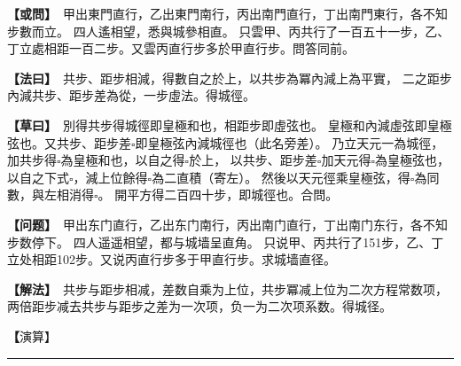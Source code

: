 \documentclass[11pt,a4paper]{article}
\let\origsquare\square
\renewcommand{\square}{\ensuremath{\origsquare}}%
\newcommand{\longline}{\noindent\rule{\textwidth}{0.4pt}}
\newcommand{\clOWEN}[1]{%
  \par\vspace{0.3em}%
  \noindent\textcolor{problemcolor}{\textbf{【或問】}}\,{\tradfont #1}\par\nopagebreak%
}
\newcommand{\mdOWEN}[1]{%
  \par\vspace{0.3em}%
  \noindent\textcolor{problemcolor}{\textbf{【问题】}}\,{\modfont #1}\par\nopagebreak%
}
\newcommand{\clFAYUE}[1]{%
  \par\noindent\textcolor{methodcolor}{\textbf{【法曰】}}\,{\tradfont #1}\par\nopagebreak%
}
\newcommand{\mdFAYUE}[1]{%
  \par\noindent\textcolor{methodcolor}{\textbf{【解法】}}\,{\modfont #1}\par\nopagebreak%
}
\newcommand{\clTSAOYUE}[1]{%
  \par\noindent\textcolor{workcolor}{\textbf{【草曰】}}\,{\tradfont #1}\par%
}
\newcommand{\mdTSAOYUE}[1]{%
  \par\noindent\textcolor{workcolor}{\textbf【演算】}}\,{\modfont #1}\par%
\begin{document}
\begin{paracol}{2}

\begin{leftcolumn}
\clOWEN{%
甲出東門直行，乙出東門南行，丙出南門直行，丁出南門東行，各不知步數而立。
四人遙相望，悉與城參相直。
只雲甲、丙共行了一百五十一步，乙、丁立處相距一百二步。又雲丙直行步多於甲直行步。問答同前。}

\clFAYUE{%
共步、距步相減，得數自之於上，以共步為冪內減上為平實，
二之距步內減共步、距步差為從，一步虛法。得城徑。}

\clTSAOYUE{%
別得共步得城徑即皇極和也，相距步即虛弦也。
皇極和內減虛弦即皇極弦也。又共步、距步差$\square$即皇極弦內減城徑也（此名旁差）。
乃立天元一為城徑，加共步得$\square$為皇極和也，以自之得$\square$於上，
以共步、距步差$\square$加天元得$\square$為皇極弦也，
以自之下式$\square$，減上位餘得$\square$為二直積（寄左）。
然後以天元徑乘皇極弦，得$\square$為同數，與左相消得$\square$。
開平方得二百四十步，即城徑也。合問。}
\end{leftcolumn}

\switchcolumn

\begin{rightcolumn}
\mdOWEN{%
甲出东门直行，乙出东门南行，丙出南门直行，丁出南门东行，各不知步数停下。
四人遥遥相望，都与城墙呈直角。
只说甲、丙共行了151步，乙、丁立处相距102步。又说丙直行步多于甲直行步。求城墙直径。}

\mdFAYUE{%
共步与距步相减，差数自乘为上位，共步冪减上位为二次方程常数项，
两倍距步减去共步与距步之差为一次项，负一为二次项系数。得城径。}

\mdTSAOYUE{%
辨识得：共步加城径即皇极和，相距步即虚弦。
皇极和减去虚弦即皇极弦。共步与距步之差$\square$即皇极弦减城径（此名「旁差」）。
设天元一为城径，加共步得$\square$为皇极和，自乘得$\square$于上位。
共步与距步之差$\square$加天元得$\square$为皇极弦，
自乘得$\square$，减上位余$\square$为两倍直积（寄左）。
然后天元径乘皇极弦，得$\square$为同数，与左式相消得$\square$。
开平方得240步，即城径。符合所问。}
\end{rightcolumn}

\end{paracol}

\vspace{0.3cm}
\begin{center}\longline\end{center}
\end{document}
